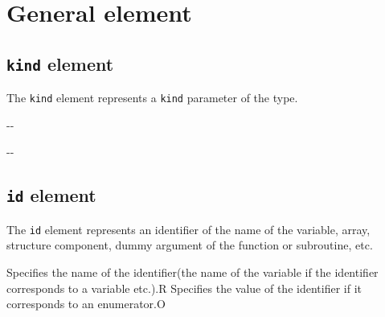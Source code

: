 \section{General element}


\subsection{ {\tt kind} element}

The {\tt kind} element represents a {\tt kind} parameter of the type.


\begin{XcodeMLChildElements}
\XcodeMLElementDef{-}
{-}{-}
\end{XcodeMLChildElements}

\begin{XcodeMLAttributes}
\XcodeMLAttrDef{-}{-}
{-}{-}
\end{XcodeMLAttributes}


\subsection{ {\tt id} element}

The {\tt id} element represents an identifier of the name of the variable, array,
structure component, dummy argument of the function or subroutine, etc.




\begin{XcodeMLChildElements}
{Specifies the name of the identifier(the name of the variable if the identifier corresponds to a variable etc.).}{R}
{Specifies the value of the identifier if it corresponds to an enumerator.}{O}
\end{XcodeMLChildElements}

